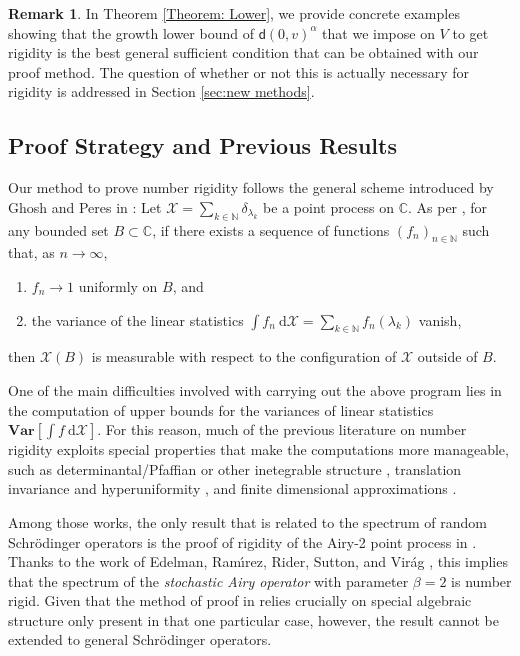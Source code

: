 \documentclass{amsart}
\numberwithin{equation}{section}
\theoremstyle{definition}
\newtheorem{remark}[theorem]{Remark}
\newcommand\al{\alpha}
\newcommand\be{\beta}
\newcommand\de{\delta}
\newcommand\la{\lambda}
\renewcommand\d{~\mathrm d}
\newcommand\mbb{\mathbb}
\newcommand\mbf{\mathbf}
\newcommand\mc{\mathcal}
\newcommand\msf{\mathsf}
\begin{document}
%

\begin{remark}
In Theorem \ref{Theorem: Lower}, we provide concrete examples showing
that the growth lower bound of $\msf d(0,v)^\al$ that we impose on $V$ to
get rigidity is the best general sufficient condition that can be obtained with our proof method.
The question of whether or not this is actually necessary for rigidity is addressed in
Section \ref{sec:new methods}.
\end{remark}

%

\subsection{Proof Strategy and Previous Results} 

%

Our method to prove number rigidity follows the general scheme introduced by Ghosh and Peres
in \cite{GP17}: Let $\mc X=\sum_{k\in\mbb N}\de_{\la_k}$ be a point process on $\mbb C$.
As per \cite[Theorem 6.1]{GP17}, for any bounded set $B\subset\mbb C$, if there exists
a sequence of functions $(f_n)_{n\in\mbb N}$ such that, as $n\to\infty$,
\begin{enumerate}
\item $f_n\to1$ uniformly on $B$, and
\item the variance of the linear statistics
$\int f_n\d\mc X=\sum_{k\in\mbb N}f_n(\la_k)$ vanish,
\end{enumerate}
then $\mc X(B)$ is measurable
with respect to the configuration of $\mc X$ outside of $B$.

%

One of the main difficulties involved with carrying out the above program lies in
the computation of upper bounds for the variances of linear statistics $\mbf{Var}[\int f\d\mc X]$.
For this reason, much of the previous literature on number rigidity exploits special
properties that make the computations more manageable, such as
determinantal/Pfaffian or other inetegrable structure \cite{Buf16,BNQ18,G15,GL18,GP17}, translation
invariance and hyperuniformity \cite{GS19,Ghosh17}, and finite dimensional approximations \cite{RN18}.

%

Among those works, the only result that is related to the spectrum of random Schr\"odinger operators
is the proof of rigidity of the Airy-2 point process in \cite{Buf16}. Thanks to the work of Edelman,
Ram{\'\i}rez, Rider, Sutton, and Vir\'ag \cite{EdelmanSutton,RamirezRiderVirag}, this implies that the spectrum
of the {\it stochastic Airy operator} with parameter $\be=2$ is number rigid. Given that the
method of proof in \cite{Buf16} relies crucially on special algebraic structure only present in that
one particular case, however, the result cannot be extended to general Schr\"odinger operators.
\end{document}

